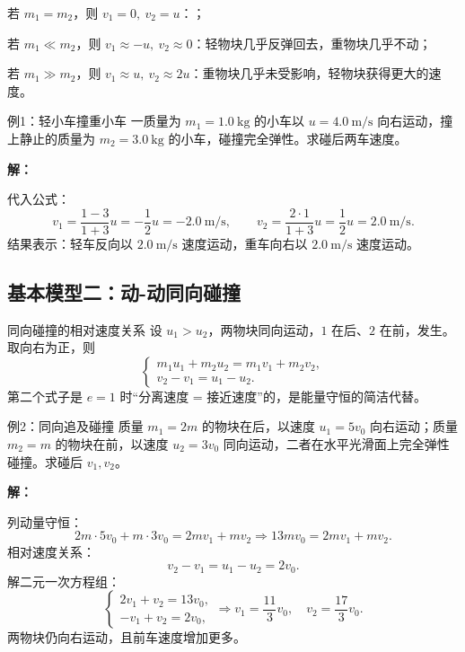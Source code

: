 \documentclass[a4paper,11pt]{ctexart}
\begin{document}
\begin{focuspoints}
  \item 若 $m_1 = m_2$，则 $v_1 = 0,\ v_2 = u$：；
  \item 若 $m_1 \ll m_2$，则 $v_1 \approx -u,\ v_2 \approx 0$：轻物块几乎反弹回去，重物块几乎不动；
  \item 若 $m_1 \gg m_2$，则 $v_1 \approx u,\ v_2 \approx 2u$：重物块几乎未受影响，轻物块获得更大的速度。
\end{focuspoints}

\begin{examplebox}{例1：轻小车撞重小车}
一质量为 $m_1=1.0\ \mathrm{kg}$ 的小车以 $u=4.0\ \mathrm{m/s}$ 向右运动，撞上静止的质量为 $m_2=3.0\ \mathrm{kg}$ 的小车，碰撞完全弹性。求碰后两车速度。

\textbf{解：}\par
代入公式：
\[
  v_1 = \frac{1-3}{1+3}u = -\frac12 u = -2.0\ \mathrm{m/s},
  \qquad
  v_2 = \frac{2\cdot 1}{1+3}u = \frac12 u = 2.0\ \mathrm{m/s}.
\]
结果表示：轻车反向以 $2.0\ \mathrm{m/s}$ 速度运动，重车向右以 $2.0\ \mathrm{m/s}$ 速度运动。
\end{examplebox}

\subsection{基本模型二：动-动同向碰撞}

\begin{conceptbox}{同向碰撞的相对速度关系}
设 $u_1>u_2$，两物块同向运动，$1$ 在后、$2$ 在前，发生。取向右为正，则
\[
  \begin{cases}
    m_1u_1 + m_2u_2 = m_1v_1 + m_2v_2,\\[0.3em]
    v_2 - v_1 = u_1 - u_2.
  \end{cases}
\]
第二个式子是 $e=1$ 时“分离速度 = 接近速度”的，是能量守恒的简洁代替。
\end{conceptbox}

\begin{examplebox}{例2：同向追及碰撞}
质量 $m_1=2m$ 的物块在后，以速度 $u_1=5v_0$ 向右运动；质量 $m_2=m$ 的物块在前，以速度 $u_2=3v_0$ 同向运动，二者在水平光滑面上完全弹性碰撞。求碰后 $v_1,v_2$。

\textbf{解：}\par
列动量守恒：
\[
  2m\cdot 5v_0 + m\cdot 3v_0 = 2mv_1 + mv_2
  \Rightarrow 13mv_0 = 2mv_1 + mv_2.
\]
相对速度关系：
\[
  v_2 - v_1 = u_1 - u_2 = 2v_0.
\]
解二元一次方程组：
\[
  \begin{cases}
    2v_1 + v_2 = 13v_0,\\
    -v_1 + v_2 = 2v_0,
  \end{cases}
  \Rightarrow v_1 = \dfrac{11}{3}v_0,\quad v_2 = \dfrac{17}{3}v_0.
\]
两物块仍向右运动，且前车速度增加更多。
\end{examplebox}
\end{document}
